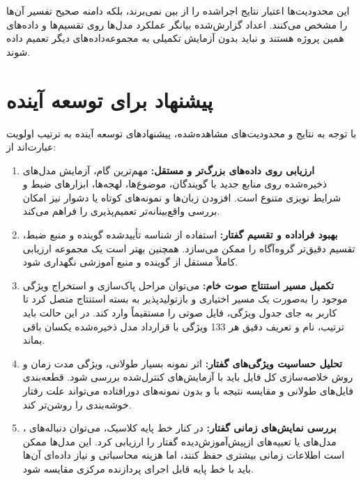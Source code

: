 \documentclass[12pt,a4paper,oneside]{report}
\begin{document}
این محدودیت‌ها اعتبار نتایج اجراشده را از بین نمی‌برند، بلکه دامنه صحیح تفسیر آن‌ها را مشخص می‌کنند. اعداد گزارش‌شده بیانگر عملکرد مدل‌ها روی تقسیم‌ها و داده‌های همین پروژه هستند و نباید بدون آزمایش تکمیلی به مجموعه‌داده‌های دیگر تعمیم داده شوند.


\section{پیشنهاد برای توسعه آینده}

با توجه به نتایج و محدودیت‌های مشاهده‌شده، پیشنهادهای توسعه آینده به ترتیب اولویت عبارت‌اند از:

\begin{enumerate}
	\item \textbf{ارزیابی روی داده‌های بزرگ‌تر و مستقل:}
	مهم‌ترین گام، آزمایش مدل‌های ذخیره‌شده روی منابع جدید با گویندگان، موضوع‌ها، لهجه‌ها، ابزارهای ضبط و شرایط نویزی متنوع است. افزودن زبان‌ها و نمونه‌های کوتاه یا دشوار نیز امکان بررسی واقع‌بینانه‌تر تعمیم‌پذیری را فراهم می‌کند.

	\item \textbf{بهبود فراداده و تقسیم گفتار:}
	استفاده از شناسه تأییدشده گوینده و منبع ضبط، تقسیم دقیق‌تر گروه‌آگاه را ممکن می‌سازد. همچنین بهتر است یک مجموعه ارزیابی کاملاً مستقل از گوینده و منبع آموزشی نگهداری شود.

	\item \textbf{تکمیل مسیر استنتاج صوت خام:}
	می‌توان مراحل پاک‌سازی و استخراج ویژگی موجود را به‌صورت یک مسیر اختیاری و بازتولیدپذیر به بسته استنتاج متصل کرد تا کاربر به جای جدول ویژگی، فایل صوتی را مستقیماً وارد کند. در این حالت باید ترتیب، نام و تعریف دقیق هر 133 ویژگی با قرارداد مدل ذخیره‌شده یکسان باقی بماند.

	\item \textbf{تحلیل حساسیت ویژگی‌های گفتار:}
	اثر نمونه بسیار طولانی، ویژگی مدت زمان و روش خلاصه‌سازی کل فایل باید با آزمایش‌های کنترل‌شده بررسی شود. قطعه‌بندی فایل‌های طولانی و مقایسه نتیجه با و بدون نمونه‌های دورافتاده می‌تواند علت رفتار خوشه‌بندی را روشن‌تر کند.

	\item \textbf{بررسی نمایش‌های زمانی گفتار:}
	در کنار خط پایه کلاسیک، می‌توان دنباله‌های
	،
	مدل‌های
	یا تعبیه‌های ازپیش‌آموزش‌دیده گفتار را ارزیابی کرد. این مدل‌ها ممکن است اطلاعات زمانی بیشتری حفظ کنند، اما هزینه محاسباتی و نیاز داده‌ای آن‌ها باید با خط پایه قابل اجرای پردازنده مرکزی مقایسه شود.


\end{enumerate}
\end{document}
